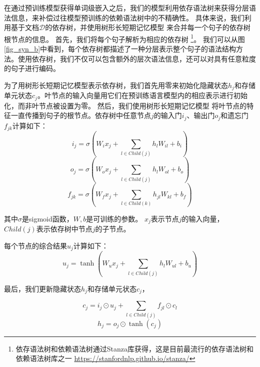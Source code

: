 \documentclass[bachelor]{thesis-uestc}
\begin{document}
在通过预训练模型获得单词级嵌入之后，我们的模型利用依存语法树来获得分层语法信息，来补偿过往模型预训练的依赖语法树中的不精确性。
具体来说，我们利用基于文档$\mathcal{D}$的依存树，并使用树形长短期记忆模型  \cite{miwa-bansal-2016-end, duan-etal-2022-just}来合并每一个句子的依存树根节点的信息。
首先，我们将每个句子解析为相应的依存树 \footnote{依存语法树和依赖语法树通过Stanza库获得，这是目前最流行的依存语法树和依赖语法树库之一 \href{https://stanfordnlp.github.io/stanza/} { https://stanfordnlp.github.io/stanza/}}。
我们可以从图 \ref{fig_syn_b}中看到，每个依存树都描述了一种分层表示整个句子的语法结构方法。使用依存树，我们不仅可以包含额外的层次语法信息，还可以对具有任意粒度的句子进行编码。\par

为了用树形长短期记忆模型表示依存树，我们首先用零来初始化隐藏状态$h_j$和存储单元状态$c_j$。叶节点的输入向量用它们在预训练语言模型内的相应表示进行初始化，而非叶节点被设置为零。
然后，我们使用树形长短期记忆模型 \cite{miwa-bansal-2016-end}将叶节点的特征一直传播到句子的根节点。依存树中任意节点$j$的输入门$i_j$、输出门$o_j$和遗忘门$f_{jk}$计算如下：
\begin{equation}
    i_j = \sigma(W_ix_j +\sum_{l \in Child(j)}h_{l}W_{il}+b_i) 
\end{equation}
\begin{equation}
    o_j = \sigma(W_ox_j +\sum_{l \in Child(j)}h_{l}W_{ol}+b_o) 
\end{equation}
\begin{equation}
    f_{jk} = \sigma(W_fx_j +\sum_{l \in Child(k)}h_{jl}W_{kl}+b_f)
\end{equation}

其中$\sigma$是sigmoid函数，$W, b$是可训练的参数。
$x_j$表示节点$j$的输入向量，$Child(j)$表示依存树中节点$j$的子节点。\par
每个节点的综合结果$u_j$计算如下：
\begin{equation}
    u_j = \tanh(W_ux_j +\sum_{l \in Child(j)}h_{l}W_{ul}+b_u)
\end{equation}
\par

最后，我们更新隐藏状态$h_j$和存储单元状态$c_j$，

\begin{equation}
    c_j = i_j \odot u_j + \sum_{l \in Child(j)} f_{jl} \odot c_l
\end{equation}
\begin{equation}
    h_j = o_j \odot \tanh(c_j)
\end{equation}
\par
\end{document}
